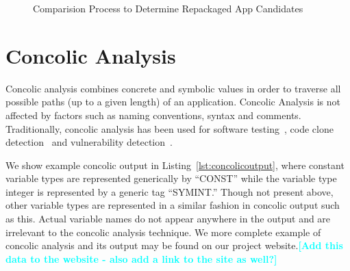 \documentclass{sig-alternate}
\newcommand{\todo}[1]{\textcolor{cyan}{\textbf{[#1]}}}
\begin{document}
\begin{figure*}[t]
\begin{center}
\begin{tikzpicture}[node distance = 2.0cm, auto]






\end{tikzpicture}
\caption{Comparision Process to Determine Repackaged App Candidates}
\end{center}
\end{figure*}

\section{Concolic Analysis}

%	


Concolic analysis combines concrete and symbolic values in order to traverse all possible paths (up to a given length) of an application. Concolic Analysis is not affected by factors such as naming conventions, syntax and comments. Traditionally, concolic analysis has been used for software testing~\cite{Sen:2005:CCU:1081706.1081750}, code clone detection~\cite{krutz2013cccd} and vulnerability detection~\cite{Chen:2014:CIB:2554850.2554875}.

We show example concolic output in Listing~\ref{lst:concolicoutput}, where constant variable types are represented generically by ``CONST'' while the variable type integer is represented by a generic tag ``SYMINT.'' Though not present above, other variable types are represented in a similar fashion in concolic output such as this. Actual variable names do not appear anywhere in the output and are irrelevant to the concolic analysis technique. We more complete example of concolic analysis and its output may be found on our project website.\todo{Add this data to the website - also add a link to the site as well?}

\end{document}
